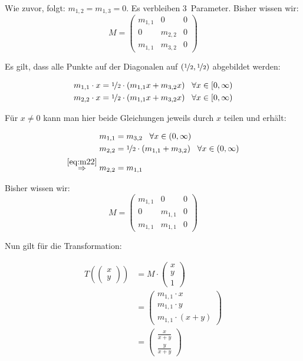 \documentclass[a4paper]{scrartcl}
\begin{document}
Wie zuvor, folgt: $m_{1,2} = m_{1,3} = 0$. Es verbleiben 3~Parameter.
\goodbreak
Bisher wissen wir:\nobreak
\[M = \begin{pmatrix}      m_{1,1} &       0 & 0\\
                                 0 & m_{2,2} & 0\\
                           m_{1,1} & m_{3,2} & 0\end{pmatrix}\]

Es gilt, dass alle Punkte auf der Diagonalen auf $(\nicefrac{1}{2}, \nicefrac{1}{2})$
abgebildet werden:

\begin{align}
    m_{1,1} \cdot x &= \nicefrac{1}{2} \cdot (m_{1,1} x + m_{3,2} x) \;\;\; \forall x \in [0, \infty)\\
    m_{2,2} \cdot x &= \nicefrac{1}{2} \cdot (m_{1,1} x + m_{3,2} x) \;\;\; \forall x \in [0, \infty)
\end{align}

Für $x \neq 0$ kann man hier beide Gleichungen jeweils durch $x$ teilen und erhält:

\begin{align}
    m_{1,1} &= m_{3,2} \;\;\; \forall x \in (0, \infty)\\
    m_{2,2} &= \nicefrac{1}{2} \cdot (m_{1,1} + m_{3,2}) \;\;\; \forall x \in (0, \infty)\label{eq:m22}\\
    \overset{\ref{eq:m22}}{\Rightarrow} m_{2,2} &= m_{1,1}
\end{align}

Bisher wissen wir:\nobreak
\[M = \begin{pmatrix}      m_{1,1} &       0 & 0\\
                                 0 & m_{1,1} & 0\\
                           m_{1,1} & m_{1,1} & 0\end{pmatrix}\]

Nun gilt für die Transformation:

\begin{align}
    T(\begin{pmatrix}x\\y\end{pmatrix}) &= M \cdot \begin{pmatrix}x\\y\\1\end{pmatrix}\\
      &= \begin{pmatrix}m_{1,1} \cdot x\\m_{1,1} \cdot y\\m_{1,1} \cdot (x+y)\end{pmatrix}\\
      &= \begin{pmatrix}\frac{x}{x+y}\\\frac{y}{x+y}\end{pmatrix}
\end{align}
\end{document}
